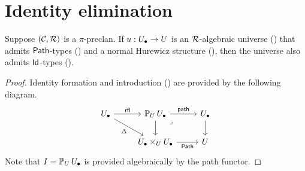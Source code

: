 \section{Identity elimination}

\begin{theorem}\label{thm:id-elim}
  Suppose $(\CC,\RR)$ is a $\pi$-preclan.
  If $\uu : \Ulow \to \U$ is an $\RR$-algebraic universe () that
  admits $\Path$-types ()
  and a normal Hurewicz structure (),
  then the universe also admits $\Id$-types ().
\end{theorem}
\begin{proof}
  Identity formation and introduction ()
  are provided by the following diagram.
  \[\begin{tikzcd}
    \Ulow & {{\arr[\U] \Ulow}} & \Ulow \\
    & {\Ulow \times_\U \Ulow} & \U
    \arrow["\rfl", from=1-1, to=1-2]
    \arrow["\Delta"', from=1-1, to=2-2]
    \arrow["\path", from=1-2, to=1-3]
    \arrow[from=1-2, to=2-2]
    \arrow["\lrcorner"{anchor=center, pos=0.125}, draw=none, from=1-2, to=2-3]
    \arrow[from=1-3, to=2-3]
    \arrow["\Path"', from=2-2, to=2-3]
  \end{tikzcd}\]
  Note that $I = {\arr[\U] \Ulow}$ is provided algebraically by the path functor.
  

\end{proof}
